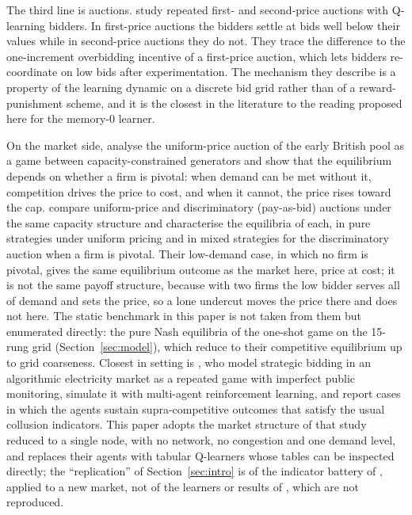 The third line is auctions. \citet{banchio2022} study repeated first- and second-price auctions with Q-learning bidders. In first-price auctions the bidders settle at bids well below their values while in second-price auctions they do not. They trace the difference to the one-increment overbidding incentive of a first-price auction, which lets bidders re-coordinate on low bids after experimentation. The mechanism they describe is a property of the learning dynamic on a discrete bid grid rather than of a reward-punishment scheme, and it is the closest in the literature to the reading proposed here for the memory-0 learner.

On the market side, \citet{vonderfehr1993} analyse the uniform-price auction of the early British pool as a game between capacity-constrained generators and show that the equilibrium depends on whether a firm is pivotal: when demand can be met without it, competition drives the price to cost, and when it cannot, the price rises toward the cap. \citet{fabra2006} compare uniform-price and discriminatory (pay-as-bid) auctions under the same capacity structure and characterise the equilibria of each, in pure strategies under uniform pricing and in mixed strategies for the discriminatory auction when a firm is pivotal. Their low-demand case, in which no firm is pivotal, gives the same equilibrium outcome as the market here, price at cost; it is not the same payoff structure, because with two firms the low bidder serves all of demand and sets the price, so a lone undercut moves the price there and does not here. The static benchmark in this paper is not taken from them but enumerated directly: the pure Nash equilibria of the one-shot game on the 15-rung grid (Section~\ref{sec:model}), which reduce to their competitive equilibrium up to grid coarseness. Closest in setting is \citet{seredynski2026}, who model strategic bidding in an algorithmic electricity market as a repeated game with imperfect public monitoring, simulate it with multi-agent reinforcement learning, and report cases in which the agents sustain supra-competitive outcomes that satisfy the usual collusion indicators. This paper adopts the market structure of that study reduced to a single node, with no network, no congestion and one demand level, and replaces their agents with tabular Q-learners whose tables can be inspected directly; the ``replication'' of Section~\ref{sec:intro} is of the indicator battery of \citet{calvano2020}, applied to a new market, not of the learners or results of \citet{seredynski2026}, which are not reproduced.

